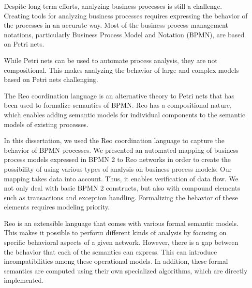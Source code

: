 Despite long-term efforts, analyzing business processes is still a challenge. 
Creating tools for analyzing business processes requires expressing the behavior of the processes in an accurate way. Most of the business process management notations, particularly Business Process Model and Notation (BPMN), are based on Petri nets. 

While Petri nets can be used to automate process analysis, they are not compositional. This makes analyzing the behavior of large and complex models based on Petri nets challenging. %

The Reo coordination language is an alternative theory to Petri nets that has been used to formalize semantics of BPMN. Reo has a compositional nature, which enables adding semantic models for individual components to the semantic models of existing processes. %

In this dissertation, we used the Reo coordination language to capture the behavior of BPMN processes.  
We presented an automated mapping of business process models expressed in BPMN 2 to Reo networks in order to create the possibility of using various types of analysis on business process models. Our mapping takes data into account. Thus, it enables verification of  data flow.  
 We not only deal with basic BPMN 2 constructs, but also with compound elements such as transactions and exception handling. Formalizing the behavior of these elements requires modeling priority. %

Reo is an extensible language that comes with various formal semantic models. This makes it possible to perform different kinds of analysis by focusing on specific behavioral aspects of a given network. However, there is a gap between the behavior that each of the semantics can express. This can introduce incompatibilities among these operational models. In addition, these formal semantics are computed using their own specialized algorithms, which are directly implemented. %

